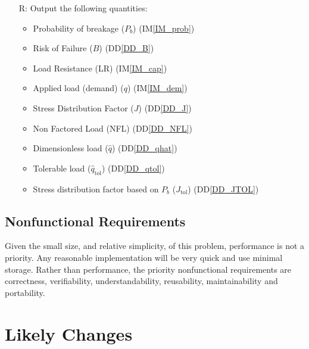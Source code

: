 \documentclass[12pt]{article}
\newcommand{\ddref}[1]{DD\ref{#1}}
\newcommand{\iref}[1]{IM\ref{#1}}
\newcounter{reqnum} %
\begin{document}
\begin{itemize}
\item[R\refstepcounter{reqnum}\thereqnum \label{R_Output}:]
  Output the following quantities:
\begin{itemize}
\item Probability of breakage ($P_b$) (\iref{IM_prob})
\item Risk of Failure ($B$) (\ddref{DD_B})
\item Load Resistance (LR) (\iref{IM_cap})
\item Applied load (demand) ($q$) (\iref{IM_dem})
\item Stress Distribution Factor ($J$) (\ddref{DD_J})
\item Non Factored Load (NFL) (\ddref{DD_NFL})
\item Dimensionless load ($\hat{q}$) (\ddref{DD_qhat})
\item Tolerable load ($\hat{q}_{\text{tol}}$) (\ddref{DD_qtol})
\item Stress distribution factor based on $P_b$ ($J_{\text{tol}}$) (\ddref{DD_JTOL})
\end{itemize}

\end{itemize}

\subsection{Nonfunctional Requirements}

Given the small size, and relative simplicity, of this problem, performance is
not a priority.  Any reasonable implementation will be very quick and use
minimal storage.  Rather than performance, the priority nonfunctional
requirements are correctness, verifiability, understandability, reusability, 
maintainability and portability.

\section{Likely Changes}    
\end{document}
